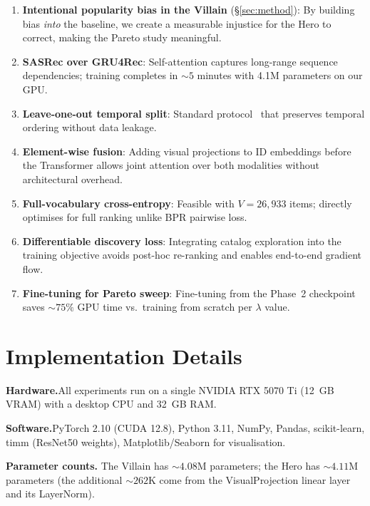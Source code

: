 \documentclass[11pt, a4paper]{article}
\let\oldsection\section
\renewcommand{\section}[1]{\FloatBarrier\oldsection{#1}}
\begin{document}
\begin{enumerate}[leftmargin=*,itemsep=3pt]
    \item \textbf{Intentional popularity bias in the Villain} (\S\ref{sec:method}): By building bias \emph{into} the baseline, we create a measurable injustice for the Hero to correct, making the Pareto study meaningful.

    \item \textbf{SASRec over GRU4Rec}: Self-attention captures long-range sequence dependencies; training completes in ${\sim}5$ minutes with 4.1M parameters on our GPU.

    \item \textbf{Leave-one-out temporal split}: Standard protocol~\cite{kang2018self} that preserves temporal ordering without data leakage.

    \item \textbf{Element-wise fusion}: Adding visual projections to ID embeddings before the Transformer allows joint attention over both modalities without architectural overhead.

    \item \textbf{Full-vocabulary cross-entropy}: Feasible with $V{=}26{,}933$ items; directly optimises for full ranking unlike BPR pairwise loss.

    \item \textbf{Differentiable discovery loss}: Integrating catalog exploration into the training objective avoids post-hoc re-ranking and enables end-to-end gradient flow.

    \item \textbf{Fine-tuning for Pareto sweep}: Fine-tuning from the Phase~2 checkpoint saves ${\sim}75\%$ GPU time vs.\ training from scratch per $\lambda$ value.
\end{enumerate}

\section{Implementation Details}
\label{sec:implementation}

\textbf{Hardware.}\quad All experiments run on a single NVIDIA RTX 5070 Ti (12~GB VRAM) with a desktop CPU and 32~GB RAM.

\textbf{Software.}\quad PyTorch 2.10 (CUDA 12.8), Python 3.11, NumPy, Pandas, scikit-learn, timm (ResNet50 weights), Matplotlib/Seaborn for visualisation.

\textbf{Parameter counts.}\quad
The Villain has ${\sim}4.08$M parameters; the Hero has ${\sim}4.11$M parameters (the additional ${\sim}262$K come from the VisualProjection linear layer and its LayerNorm).
\end{document}
